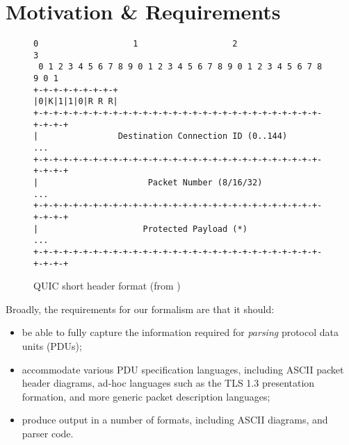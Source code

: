 \documentclass[10pt,sigconf]{acmart}
\begin{document}
%
%

\section{Motivation \& Requirements}
\label{sec:motivation}

\begin{figure}
	\centering
	\vspace{3mm}
    \begin{BVerbatim}[fontsize=\scriptsize]
 0                   1                   2                   3
 0 1 2 3 4 5 6 7 8 9 0 1 2 3 4 5 6 7 8 9 0 1 2 3 4 5 6 7 8 9 0 1
+-+-+-+-+-+-+-+-+
|0|K|1|1|0|R R R|
+-+-+-+-+-+-+-+-+-+-+-+-+-+-+-+-+-+-+-+-+-+-+-+-+-+-+-+-+-+-+-+-+
|                Destination Connection ID (0..144)           ...
+-+-+-+-+-+-+-+-+-+-+-+-+-+-+-+-+-+-+-+-+-+-+-+-+-+-+-+-+-+-+-+-+
|                      Packet Number (8/16/32)                ...
+-+-+-+-+-+-+-+-+-+-+-+-+-+-+-+-+-+-+-+-+-+-+-+-+-+-+-+-+-+-+-+-+
|                     Protected Payload (*)                   ...
+-+-+-+-+-+-+-+-+-+-+-+-+-+-+-+-+-+-+-+-+-+-+-+-+-+-+-+-+-+-+-+-+
    \end{BVerbatim}
    \caption{QUIC short header format (from \cite{draft-ietf-quic-transport-latest})}
    \label{fig:quic-short-hdr}
\end{figure}

Broadly, the requirements for our formalism are that it should:
\begin{itemize}
	\item be able to fully capture the information required for \emph{parsing} protocol
		  data units (PDUs);
	\item accommodate various PDU specification languages, including ASCII
		  packet header diagrams, ad-hoc languages
		  such as the TLS 1.3 presentation formation, and more generic packet description
		  languages;
	\item produce output in a number of formats, including ASCII diagrams, and parser
		  code.
\end{itemize}
\end{document}
